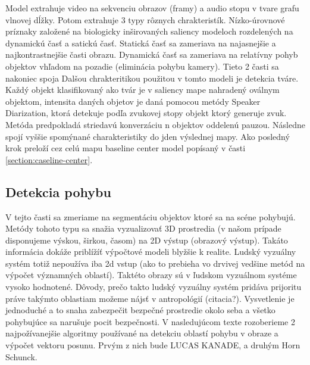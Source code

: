 Model extrahuje video na sekvenciu obrazov (framy) a audio stopu v tvare grafu vlnovej dĺžky. Potom extrahuje 3 typy rôznych chrakteristík. Nízko-úrovnové príznaky založené na biologicky inširovaných saliency modeloch rozdelených na dynamickú časť a satickú časť. Statická časť sa zameriava na najasnejšie a najkontrastnejšie časti obrazu. Dynamická časť sa zameriava na relatívny pohyb objektov vhľadom na pozadie (eliminácia pohybu kamery). Tieto 2 časti sa nakoniec spoja
Dalšou chrakteritikou použitou v tomto modeli je detekcia tváre. Každý objekt klasifikovaný ako tvár je v saliency mape nahradený oválnym objektom, intensita daných objetov je daná pomocou metódy Speaker Diarization, ktorá detekuje podľa zvukovej stopy objekt ktorý generuje zvuk. Metóda predpokladá striedavú konverzáciu n objektov oddelenú pauzou. Následne spojí vyššie spomýnané charakteristiky do jden výslednej mapy. Ako posledný krok preloží cez celú mapu baseline center model popísaný v časti \ref{section:caseline-center}.

\subsection{Detekcia pohybu}
V tejto časti sa zmeriame na segmentáciu objektov ktoré sa na scéne pohybujú. Metódy tohoto typu sa snažia vyzualizovať 3D prostredia (v našom prípade disponujeme výskou, širkou, časom) na 2D výstup (obrazový výstup). Takáto informácia dokáže priblížíť výpočtové modeli blyžšie k realite. Ludský vyzuálny systém totiž nepoužíva iba 2d vstup (ako to prebieha vo drvivej vedšine metód na výpočet významných oblastí). Taktéto obrazy sú v ľudskom vyzuálnom systéme vysoko hodnotené. Dôvody, prečo takto ludský vyzuálny systém pridáva prijoritu práve takýmto oblastiam možeme nájsť v antropológií (citacia?). Vysvetlenie je jednoduché a to snaha zabezpečit bezpečné prostredie okolo seba a všetko pohybujúce sa narušuje pocit bezpečnosti. V nasledujúcom texte rozoberieme 2 najpožívanejšie algoritmy používané na detekciu oblastí pohybu v obraze a výpočet vektoru posunu. Prvým z nich bude LUCAS KANADE\cite{lucas-kanade}, a druhým Horn Schunck\cite{horn-schunck}.

